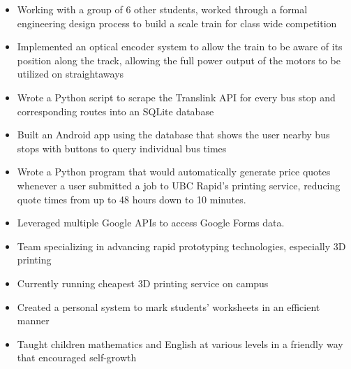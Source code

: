 \documentclass{resume}
\begin{document}
\begin{itemize}
	\item Working with a group of 6 other students, worked through a formal engineering design process to build a scale train for class wide competition
	\item Implemented an optical encoder system to allow the train to be aware of its position along the track, allowing the full power output of the motors to be utilized on straightaways
\end{itemize}

\begin{itemize}
	\item Wrote a Python script to scrape the Translink API for every bus stop and corresponding routes into an SQLite database
	\item Built an Android app using the database that shows the user nearby bus stops with buttons to query individual bus times
\end{itemize}

\begin{itemize}
	\item Wrote a Python program that would automatically generate price quotes whenever a user submitted a job to UBC Rapid's printing service, reducing quote times from up to 48 hours down to 10 minutes.
	\item Leveraged multiple Google APIs to access Google Forms data.
\end{itemize}

\StudentTeams

\begin{itemize}
	\item Team specializing in advancing rapid prototyping technologies, especially 3D printing
	\item Currently running cheapest 3D printing service on campus
\end{itemize}

\OtherWorkExperience

\begin{itemize}
	\item Created a personal system to mark students' worksheets in an efficient manner
	\item Taught children mathematics and English at various levels in a friendly way that encouraged self-growth
\end{itemize}
\end{document}
